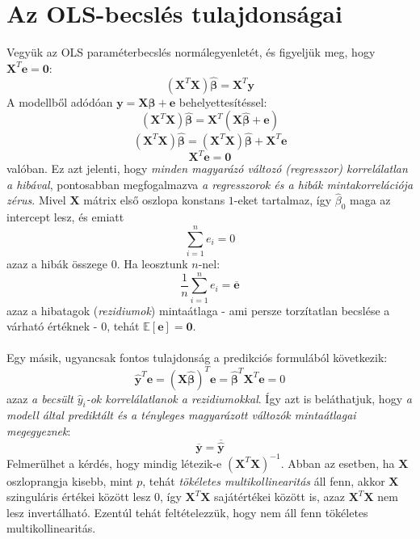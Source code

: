 \documentclass[14p]{report}
\def\pmb{\boldsymbol}
\def\ebeta{\hat{\pmb{\beta}}}
\def\bar{\overline}
\begin{document}
	\section{Az OLS-becslés tulajdonságai}
	Vegyük az OLS paraméterbecslés normálegyenletét, és figyeljük meg, hogy $\pmb{X}^T\pmb{e} = \pmb{0}$:
	\[
	(\pmb{X}^T\pmb{X})\ebeta = \pmb{X}^T\pmb{y}
	\]
	A modellből adódóan $\pmb{y} = \pmb{X}\ebeta + \pmb{e}$ behelyettesítéssel:
	\[
	(\pmb{X}^T\pmb{X})\ebeta = \pmb{X}^T(\pmb{X}\ebeta + \pmb{e})
	\]
	\[
	(\pmb{X}^T\pmb{X})\ebeta = (\pmb{X}^T\pmb{X})\ebeta + \pmb{X}^T\pmb{e}
	\]
	\[
	\pmb{X}^T\pmb{e} = \pmb{0}
	\]
	valóban. Ez azt jelenti, hogy \emph{minden magyarázó változó (regresszor) korrelálatlan a hibával}, pontosabban megfogalmazva \emph{a regresszorok és a hibák mintakorrelációja zérus}. Mivel $\pmb{X}$ mátrix első oszlopa konstans $1$-eket tartalmaz, így $\hat{\beta}_0$ maga az intercept lesz, és emiatt 
	\[
	\sum_{i=1}^{n}e_i = 0
	\]
	azaz a hibák összege $0$. Ha leosztunk $n$-nel:
	\[
	\frac{1}{n}\sum_{i=1}^{n}e_i = \bar{\pmb{e}}
	\]
	azaz a hibatagok (\emph{rezidiumok}) mintaátlaga - ami persze torzítatlan becslése a várható értéknek - $0$, tehát $\mathbb{E}[\pmb{e}] = \pmb{0}$.
	\\
	\\
	Egy másik, ugyancsak fontos tulajdonság a predikciós formulából következik:
	\[
	\hat{\pmb{y}}^T\pmb{e} = (\pmb{X}\ebeta)^T\pmb{e} = \ebeta^T\pmb{X}^T\pmb{e} = 0
	\]
	azaz \emph{a becsült $\hat{y}_i$-ok korrelálatlanok a rezidiumokkal}. Így azt is beláthatjuk, hogy \emph{a modell által prediktált és a tényleges magyarázott változók mintaátlagai megegyeznek}:
	\[
	\bar{\pmb{y}} = \bar{\hat{\pmb{y}}}
	\]
	Felmerülhet a kérdés, hogy mindig létezik-e $(\pmb{X}^T\pmb{X})^{-1}$. Abban az esetben, ha $\pmb{X}$ oszloprangja kisebb, mint $p$, tehát \emph{tökéletes multikollinearitás} áll fenn, akkor $\pmb{X}$ szinguláris értékei között lesz $0$, így $\pmb{X}^T\pmb{X}$ sajátértékei között is, azaz $\pmb{X}^T\pmb{X}$ nem lesz invertálható. Ezentúl tehát feltételezzük, hogy nem áll fenn tökéletes multikollinearitás.
	
\end{document}
